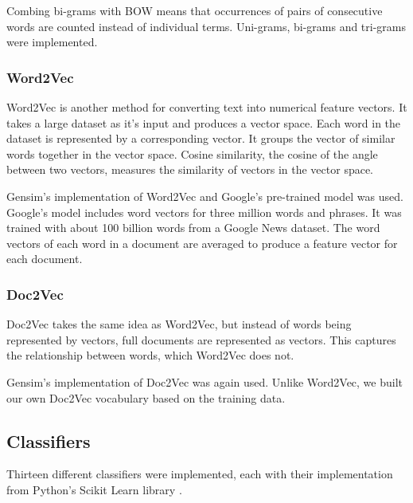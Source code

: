 Combing bi-grams with BOW means that occurrences of pairs of consecutive words are counted instead of individual terms. Uni-grams, bi-grams and tri-grams were implemented.

\subsubsection{Word2Vec}

Word2Vec is another method for converting text into numerical feature vectors. It takes a large dataset as it's input and produces a vector space. Each word in the dataset is represented by a corresponding vector. It groups the vector of similar words together in the vector space. Cosine similarity, the cosine of the angle between two vectors, measures the similarity of vectors in the vector space. 

Gensim's implementation of Word2Vec \cite{gensim} and Google's pre-trained model was used. Google's model includes word vectors for three million words and phrases. It was trained with about 100 billion words from a Google News dataset. The word vectors of each word in a document are averaged to produce a feature vector for each document.

\subsubsection*{Doc2Vec}

Doc2Vec takes the same idea as Word2Vec, but instead of words being represented by vectors, full documents are represented as vectors. This captures the relationship between words, which Word2Vec does not.

Gensim's implementation of Doc2Vec was again used. Unlike Word2Vec, we built our own Doc2Vec vocabulary based on the training data.

\subsection*{Classifiers}

Thirteen different classifiers were implemented, each with their implementation from Python's Scikit Learn library \cite{scikit-learn}.

